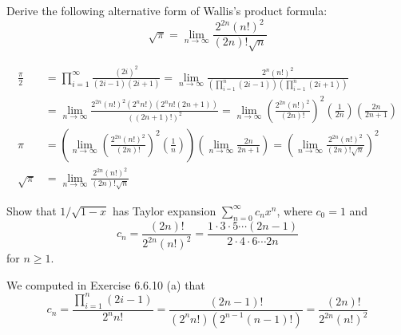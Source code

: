 \begin{exercise}
Derive the following alternative form of Wallis's product formula:
\[\sqrt{\pi} = \lim_{n \to \infty} \frac{2^{2n} (n!)^2}{(2n)! \sqrt{n}}\]
\end{exercise}
\begin{solution}
\[ \begin{aligned}
    \frac{\pi}{2} &= \prod^\infty_{i=1} \frac{(2i)^2}{(2i-1)(2i+1)} = \lim_{n \to \infty} \frac{2^n (n!)^2}{\left(\prod^n_{i=1} (2i-1)\right)\left(\prod^n_{i=1} (2i + 1) \right)} \\
    &= \lim_{n \to \infty} \frac{2^{2n} (n!)^2 (2^n n!) \left(2^n n! (2n + 1)\right)}{\left((2n+1)!\right)^2} = \lim_{n \to \infty} \left(\frac{2^{2n} (n!)^2}{(2n)!}\right)^2 \left(\frac{1}{2n}\right)\left(\frac{2n}{2n+1}\right) \\
    \pi &= \left(\lim_{n \to \infty} \left(\frac{2^{2n} (n!)^2}{(2n)!}\right)^2 \left(\frac{1}{n}\right) \right) \left( \lim_{n \to \infty}\frac{2n}{2n+1}\right) =\left(\lim_{n \to \infty} \frac{2^{2n} (n!)^2}{(2n)! \sqrt{n}}\right)^2  \\
\sqrt{\pi} &= \lim_{n \to \infty} \frac{2^{2n} (n!)^2}{(2n)! \sqrt{n}}
\end{aligned}
   \]
\end{solution}

\begin{exercise}
Show that \(1 / \sqrt{1-x}\) has Taylor expansion \(\sum^\infty_{n=0} c_n x^n\), where \(c_0 = 1\) and
\[c_n = \frac{(2n)!}{2^{2n} (n!)^2} = \frac{1 \cdot 3 \cdot 5 \cdots (2n-1)}{ 2 \cdot 4 \cdot 6 \cdots 2n}\]
for \(n \geq 1\).
\end{exercise}
\begin{solution}
We computed in Exercise 6.6.10 (a) that
\[c_n = \frac{\prod^n_{i=1} (2i - 1)}{2^n n!} = \frac{(2n-1)!}{\left(2^n n!\right)\left( 2^{n-1} (n-1)!\right)} =\frac{(2n)!}{2^{2n} (n!)^2} \]
\end{solution}
